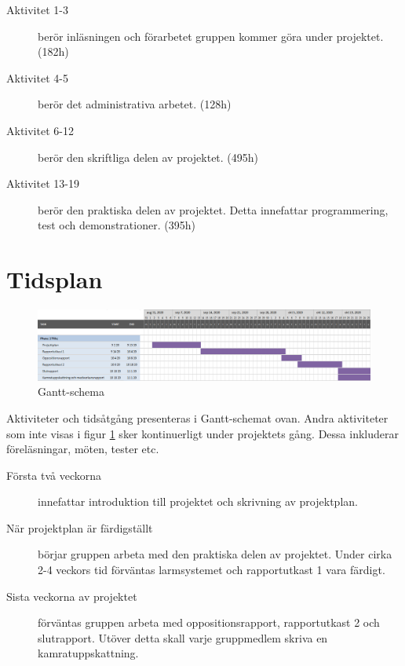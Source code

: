 \documentclass[a4paper]{article}
\begin{document}
\begin{description}
    \item[Aktivitet 1-3] berör inläsningen och förarbetet gruppen kommer göra under projektet. (182h)
    
    \item[Aktivitet 4-5] berör det administrativa arbetet. (128h)
    
    \item[Aktivitet 6-12] berör den skriftliga delen av projektet. (495h)
    
    \item[Aktivitet 13-19] berör den praktiska delen av projektet. Detta innefattar programmering, test och demonstrationer. (395h)
    
\end{description}


\section{Tidsplan}
\begin{figure}[H]
    \includegraphics[width=\textwidth]{Gantt-Schema1.png}
    \caption{Gantt-schema}
    \label{figure:gantt}
\end{figure}

Aktiviteter och tidsåtgång presenteras i Gantt-schemat ovan. Andra aktiviteter som inte visas i figur \ref{figure:gantt} sker kontinuerligt under projektets gång. Dessa inkluderar föreläsningar, möten, tester etc. 
\begin{description}
\item [Första två veckorna] innefattar introduktion till projektet och skrivning av projektplan.

\item [När projektplan är färdigställt] börjar gruppen arbeta med den praktiska delen av projektet. Under cirka 2-4 veckors tid förväntas larmsystemet och rapportutkast 1 vara färdigt. 

\item [Sista veckorna av projektet] förväntas gruppen arbeta med oppositionsrapport, rapportutkast 2 och slutrapport. Utöver detta skall varje gruppmedlem skriva en kamratuppskattning. 
\end{description}
\end{document}
